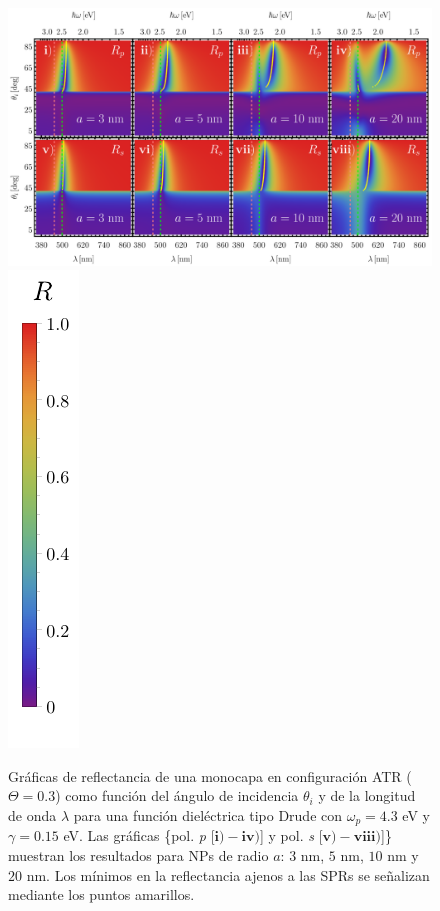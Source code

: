 \documentclass[letterpaper,11pt] {article}
\begin{document}
	\begin{figure}[b!]\centering
\includegraphics[width = .9\linewidth]{3-Wp4rVar/0-2D_Grid}%
\includegraphics[scale=1, trim={00 -15 00 00}, clip]{0-RBar_v}
	\caption{Gráficas de reflectancia de una monocapa en configuración ATR ($\Theta = 0. 3$) como función del ángulo de incidencia $\theta_i$ y de la longitud de onda $\lambda$ para una función dieléctrica tipo Drude con $\omega_p=4. 3$ eV  y  $\gamma=0. 15$ eV.  Las gráficas \{pol.  \emph{p} [$\mathbf{i)-iv)}$] y pol.  \emph{s} [$\mathbf{v)-viii)}$]\} muestran los resultados para NPs de radio  $a$: $3$ nm, $5$ nm, $10$ nm y $20$ nm.  Los mínimos en la reflectancia ajenos a las SPRs se señalizan mediante los puntos amarillos. }	\label{fig:R-RVar}	
	\end{figure}	
\end{document}
